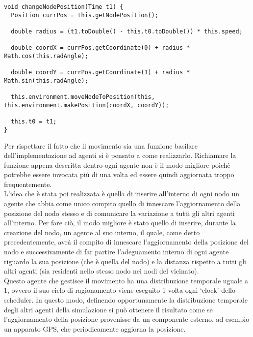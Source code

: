 \medskip
\begin{lstlisting}[firstnumber=1,label={lst:ImplementazioneAggiornamentoPosizioneNodo},caption={Implementazione aggiornamento posizione nodo}]
void changeNodePosition(Time t1) {
  Position currPos = this.getNodePosition();

  double radius = (t1.toDouble() - this.t0.toDouble()) * this.speed;

  double coordX = currPos.getCoordinate(0) + radius * Math.cos(this.radAngle);

  double coordY = currPos.getCoordinate(1) + radius * Math.sin(this.radAngle);

  this.environment.moveNodeToPosition(this, this.environment.makePosition(coordX, coordY));

  this.t0 = t1;
}
\end{lstlisting}

Per rispettare il fatto che il movimento sia una funzione basilare dell'implementazione ad agenti si è pensato a come realizzarlo. Richiamare la funzione appena descritta dentro ogni agente non è il modo migliore poichè potrebbe essere invocata più di una volta ed essere quindi aggiornata troppo frequentemente.
\\
L'idea che è stata poi realizzata è quella di inserire all'interno di ogni nodo un agente che abbia come unico compito quello di innescare l'aggiornamento della posizione del nodo stesso e di comunicare la variazione a tutti gli altri agenti all'interno. Per fare ciò, il modo migliore è stato quello di inserire, durante la creazione del nodo, un agente al suo interno, il quale, come detto precedentemente, avrà il compito di innescare l'aggiornamento della posizione del nodo e successivamente di far partire l'adeguamento interno di ogni agente riguardo la sua posizione (che è quella del nodo) e la distanza rispetto a tutti gli altri agenti (sia residenti nello stesso nodo nei nodi del vicinato).
\\
Questo agente che gestisce il movimento ha una distribuzione temporale uguale a 1, ovvero il suo ciclo di ragionamento viene eseguito 1 volta ogni `clock' dello scheduler. In questo modo, definendo opportunamente la distribuzione temporale degli altri agenti della simulazione si può ottenere il risultato come se l'aggiornamento della posizione provenisse da un componente esterno, ad esempio un apparato GPS, che periodicamente aggiorna la posizione.

